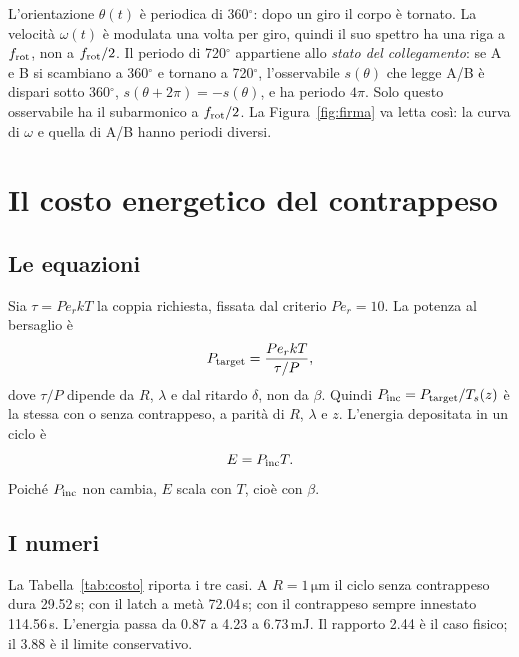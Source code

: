 \documentclass[11pt,a4paper]{article}
\providecommand{\micro}{}
\renewcommand{\micro}{\ensuremath{\mathrm{\mu}}}
\begin{document}
L'orientazione $\theta(t)$ è periodica di 360$^\circ$: dopo un giro il corpo
è tornato. La velocità $\omega(t)$ è modulata una volta per giro, quindi il
suo spettro ha una riga a $f_{\rm rot}$, non a $f_{\rm rot}/2$. Il periodo di
720$^\circ$ appartiene allo \emph{stato del collegamento}: se A e B si
scambiano a 360$^\circ$ e tornano a 720$^\circ$, l'osservabile
$s(\theta)$ che legge A/B è dispari sotto 360$^\circ$,
$s(\theta+2\pi)=-s(\theta)$, e ha periodo $4\pi$. Solo questo osservabile ha
il subarmonico a $f_{\rm rot}/2$. La Figura~\ref{fig:firma}
va letta così: la curva di $\omega$ e quella di A/B hanno periodi diversi.

\section{Il costo energetico del contrappeso}
\label{sec:costo}

\subsection{Le equazioni}

Sia $\tau=Pe_r kT$ la coppia richiesta, fissata dal criterio $Pe_r=10$. La
potenza al bersaglio è
\begin{equation}
P_{\rm target}=\frac{Pe_r kT}{\tau/P},
\label{eq:ptarget}
\end{equation}
dove $\tau/P$ dipende da $R$, $\lambda$ e dal ritardo $\delta$, non da
$\beta$. Quindi $P_{\rm inc}=P_{\rm target}/T_s(z)$ è la stessa con o senza
contrappeso, a parità di $R$, $\lambda$ e $z$. L'energia depositata in un
ciclo è
\begin{equation}
E=P_{\rm inc}T.
\label{eq:energia}
\end{equation}
Poiché $P_{\rm inc}$ non cambia, $E$ scala con $T$, cioè con $\beta$.

\subsection{I numeri}

La Tabella~\ref{tab:costo} riporta i tre casi. A $R=1\,\micro$m il ciclo
senza contrappeso dura 29.52\,s; con il latch a metà 72.04\,s; con il
contrappeso sempre innestato 114.56\,s. L'energia passa da 0.87 a 4.23 a
6.73\,mJ. Il rapporto 2.44 è il caso fisico; il 3.88 è il limite
conservativo.

\begin{table}[H]
\centering\small

\caption{Costo energetico del contrappeso a 800\,nm, $z=2\,\micro$m,
$Pe_r=10$. Le ultime due colonne sono i rapporti rispetto a un ciclo di
720$^\circ$ senza contrappeso.}
\label{tab:costo}
\end{table}
\end{document}
